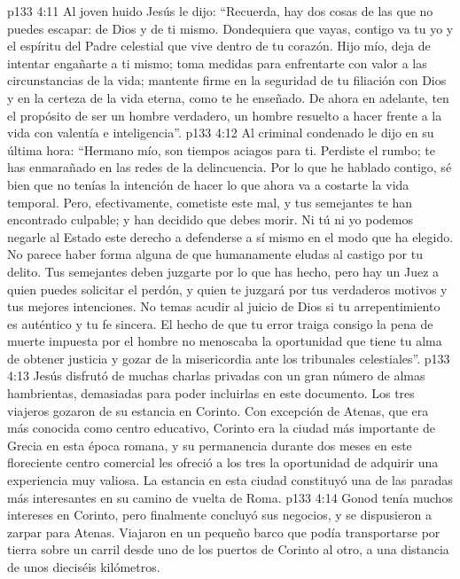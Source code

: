 \vs p133 4:11 \pc Al joven huido Jesús le dijo: “Recuerda, hay dos cosas de las que no puedes escapar: de Dios y de ti mismo. Dondequiera que vayas, contigo va tu yo y el espíritu del Padre celestial que vive dentro de tu corazón. Hijo mío, deja de intentar engañarte a ti mismo; toma medidas para enfrentarte con valor a las circunstancias de la vida; mantente firme en la seguridad de tu filiación con Dios y en la certeza de la vida eterna, como te he enseñado. De ahora en adelante, ten el propósito de ser un hombre verdadero, un hombre resuelto a hacer frente a la vida con valentía e inteligencia”.
\vs p133 4:12 \pc Al criminal condenado le dijo en su última hora: “Hermano mío, son tiempos aciagos para ti. Perdiste el rumbo; te has enmarañado en las redes de la delincuencia. Por lo que he hablado contigo, sé bien que no tenías la intención de hacer lo que ahora va a costarte la vida temporal. Pero, efectivamente, cometiste este mal, y tus semejantes te han encontrado culpable; y han decidido que debes morir. Ni tú ni yo podemos negarle al Estado este derecho a defenderse a sí mismo en el modo que ha elegido. No parece haber forma alguna de que humanamente eludas al castigo por tu delito. Tus semejantes deben juzgarte por lo que has hecho, pero hay un Juez a quien puedes solicitar el perdón, y quien te juzgará por tus verdaderos motivos y tus mejores intenciones. No temas acudir al juicio de Dios si tu arrepentimiento es auténtico y tu fe sincera. El hecho de que tu error traiga consigo la pena de muerte impuesta por el hombre no menoscaba la oportunidad que tiene tu alma de obtener justicia y gozar de la misericordia ante los tribunales celestiales”.
\vs p133 4:13 \pc Jesús disfrutó de muchas charlas privadas con un gran número de almas hambrientas, demasiadas para poder incluirlas en este documento. Los tres viajeros gozaron de su estancia en Corinto. Con excepción de Atenas, que era más conocida como centro educativo, Corinto era la ciudad más importante de Grecia en esta época romana, y su permanencia durante dos meses en este floreciente centro comercial les ofreció a los tres la oportunidad de adquirir una experiencia muy valiosa. La estancia en esta ciudad constituyó una de las paradas más interesantes en su camino de vuelta de Roma.
\vs p133 4:14 Gonod tenía muchos intereses en Corinto, pero finalmente concluyó sus negocios, y se dispusieron a zarpar para Atenas. Viajaron en un pequeño barco que podía transportarse por tierra sobre un carril desde uno de los puertos de Corinto al otro, a una distancia de unos dieciséis kilómetros.
